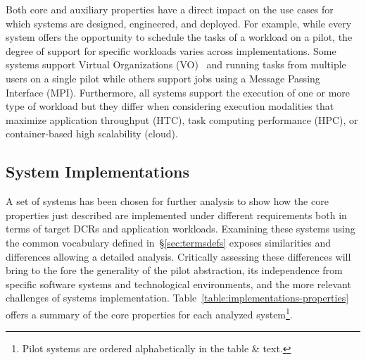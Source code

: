 \documentclass{sig-alternate}
\begin{document}
Both core and auxiliary properties have a direct impact on the use cases for
which \pilot systems are designed, engineered, and deployed. For example, while
every \pilot system offers the opportunity to schedule the tasks of a workload
on a pilot, the degree of support for specific workloads varies across
implementations. Some \pilot systems support Virtual Organizations
(VO)~\cite{foster2001} and running tasks from multiple users on a single pilot
while others support jobs using a Message Passing Interface (MPI). Furthermore,
all \pilot systems support the execution of one or more type of workload but
they differ when considering execution modalities that maximize application
throughput (HTC), task computing performance (HPC), or container-based high
scalability (cloud).



%
\subsection{\pilot System Implementations}
\label{sec:implementations}

A set of \pilot systems has been chosen for further analysis to show how the
core properties just described are implemented under different requirements both
in terms of target DCRs and application workloads. Examining these \pilot
systems using the common vocabulary defined in~\S\ref{sec:termsdefs} exposes
similarities and differences allowing a detailed analysis. Critically assessing
these differences will bring to the fore the generality of the pilot
abstraction, its independence from specific software systems and technological
environments, and the more relevant challenges of \pilot systems implementation.
Table~\ref{table:implementations-properties} offers a summary of the core
properties for each analyzed \pilot system\protect\footnote{Pilot systems are
  ordered alphabetically in the table \& text.}.
\end{document}
